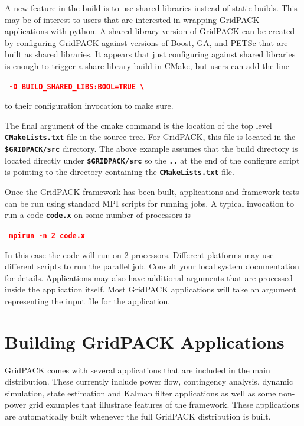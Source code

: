 \documentclass[12pt]{report} %
\begin{document}
A new feature in the build is to use shared libraries instead of static builds. This may be of interest to users that are interested in wrapping GridPACK applications with python. A shared library version of GridPACK can be created by configuring GridPACK against versions of Boost, GA, and PETSc that are built as shared libraries. It appears that just configuring against shared libraries is enough to trigger a share library build in CMake, but users can add the line

\textcolor{red}{\texttt{\textbf{    -D BUILD\_SHARED\_LIBS:BOOL=TRUE {\textbackslash}}}}

to their configuration invocation to make sure.

The final argument of the cmake command is the location of the top level \texttt{\textbf{CMakeLists.txt}} file in the source tree. For GridPACK, this file is located in the \texttt{\textbf{\$GRIDPACK/src}} directory. The above example assumes that the build directory is located directly under \texttt{\textbf{\$GRIDPACK/src}} so the \texttt{\textbf{..}} at the end of the configure script is pointing to the directory containing the \texttt{\textbf{CMakeLists.txt}} file.

Once the GridPACK framework has been built, applications and framework tests can be run using standard MPI scripts for running jobs. A typical invocation to run a code \texttt{\textbf{code.x}} on some number of processors is

\textcolor{red}{\texttt{\textbf{    mpirun -n 2 code.x}}}

In this case the code will run on 2 processors. Different platforms may use different scripts to run the parallel job. Consult your local system documentation for details. Applications may also have additional arguments that are processed inside the application itself. Most GridPACK applications will take an argument representing the input file for the application.

\chapter{Building GridPACK Applications}

GridPACK comes with several applications that are included in the main distribution. These currently include power flow, contingency analysis, dynamic simulation, state estimation and Kalman filter applications as well as some non-power grid examples that illustrate features of the framework. These applications are automatically built whenever the full GridPACK distribution is built. 
\end{document}

